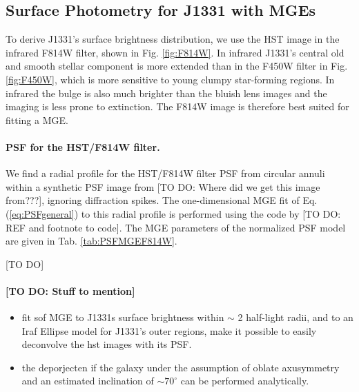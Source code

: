 \subsection{Surface Photometry for J1331 with MGEs}

To derive J1331's surface brightness distribution, we use the HST image in the infrared F814W filter, shown in Fig. \ref{fig:F814W}. In infrared J1331's central old and smooth stellar component is more extended than in the F450W filter in Fig. \ref{fig:F450W}, which is more sensitive to young clumpy star-forming regions. In infrared the bulge is also much brighter than the bluish lens images and the imaging is less prone to extinction. The F814W image is therefore best suited for fitting a MGE. 

\paragraph{PSF for the HST/F814W filter.} We find a radial profile for the HST/F814W filter PSF from circular annuli within a synthetic PSF image from [TO DO: Where did we get this image from???], ignoring diffraction spikes. The one-dimensional MGE fit of Eq. (\ref{eq:PSFgeneral}) to this radial profile is performed using the code by [TO DO: REF and footnote to code]. The MGE parameters of the normalized PSF model are given in Tab. \ref{tab:PSFMGEF814W}.

[TO DO]

\paragraph{[TO DO: Stuff to mention]}
\begin{itemize}
\item fit sof MGE to J1331s surface brightness within $\sim$ 2 half-light radii, and to an Iraf Ellipse model for J1331's outer regions, make it possible to easily deconvolve the hst images with its PSF.
\item the deporjecten if the galaxy under the assumption of oblate axusymmetry and an estimated inclination of $\sim70^\circ$ can be performed analytically.
\end{itemize}


